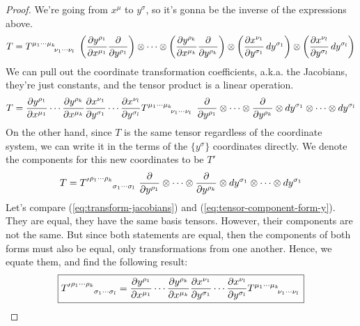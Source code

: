 \documentclass[12pt,a4paper]{article}
\begin{document}
\begin{solution_pset}
\begin{proof}
		We're going from $x^\mu$ to $y^\sigma$, so it's gonna be the 
		inverse of the expressions above.
		\[
			T 
			=
			T\indices{^{\mu_1\cdots \mu_k}_{\nu_1\cdots\nu_l}}\ 
			\pqty{
				\pdv{
					y^{\rho_1}
				}{
					x^{\mu_1}
				}
				\pdv{}{
					y^{\rho_1}
				} 
			}
			\otimes
			\cdots
			\otimes
			\pqty{
				\pdv{
					y^{\rho_k}
				}{
					x^{\mu_k}
				}
				\pdv{}{
					y^{\rho_k}
				} 
			}
			\otimes
			\pqty{
				\pdv{x^{\nu_1}}{y^{\sigma_1}}
				\dd{y^{\sigma_1}} 
			}
			\otimes
			\pqty{
				\pdv{x^{\nu_l}}{y^{\sigma_l}}
				\dd{y^{\sigma_l}} 
			}
		\]
			We can pull out the coordinate transformation coefficients, a.k.a. the Jacobians,
			they're just constants, and the tensor product is a linear operation.
			\begin{equation}
				\label{eq:transform-jacobians}
				T 
				=
					\pdv{
						y^{\rho_1}
					}{
						x^{\mu_1}
					}
					\cdots
					\pdv{
						y^{\rho_k}
					}{
						x^{\mu_k}
					}
					\pdv{x^{\nu_1}}{y^{\sigma_1}}
					\cdots
					\pdv{x^{\nu_l}}{y^{\sigma_l}}
				T\indices{^{\mu_1\cdots \mu_k}_{\nu_1\cdots\nu_l}}\ 
					\pdv{}{y^{\rho_1}} 
				\otimes
				\cdots
				\otimes
					\pdv{}{y^{\rho_k}} 
				\otimes
					\dd{y^{\sigma_1}} 
				\otimes
				\cdots
				\otimes
					\dd{y^{\sigma_l}} 
			\end{equation}
		On the other hand, since $T$ is the same tensor regardless
		of the coordinate system, we can write it in the terms of the $\{y^\sigma\}$
		coordinates directly. We denote the components for this new coordinates to be 
		$T'$
		\begin{equation}
			\label{eq:tensor-component-form-y}
			T = 
			{T'}\indices{^{\rho_1 \cdots \rho_k}_{\sigma_1\cdots\sigma_l}}\ 
			\pdv{}{y^{\rho_1}} \otimes \cdots \otimes \pdv{}{y^{\rho_k}} 
			\otimes
			\dd{y^{\sigma_1}}\otimes \cdots \otimes \dd{y^{\sigma_1}}
		\end{equation}
		Let's compare (\ref{eq:transform-jacobians}) and (\ref{eq:tensor-component-form-y}).
		They are equal, they have the same basis tensors. However, their components are not the same.
		But since both statements are equal, then the components of both forms must also
		be equal, only transformations from one another. Hence, we equate them, and find the following result:
		\begin{equation}
			\label{eq:tensor-component-transform}
			\boxed{
				{T'}\indices{^{\rho_1 \cdots \rho_k}_{\sigma_1\cdots\sigma_l}} 
				=
				\pdv{
					y^{\rho_1}
				}{
					x^{\mu_1}
				}
				\cdots
				\pdv{
					y^{\rho_k}
				}{
					x^{\mu_k}
				}
				\pdv{x^{\nu_1}}{y^{\sigma_1}}
				\cdots
				\pdv{x^{\nu_l}}{y^{\sigma_l}}
				T\indices{^{{\mu_1}\cdots{\mu_k}}_{{\nu_1}\cdots{\nu_l}}} 
			}
		\end{equation}


\end{proof}
\end{solution_pset}
\end{document}
